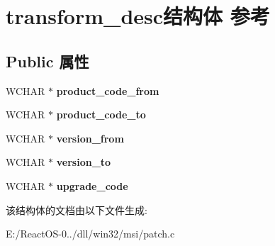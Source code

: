 \hypertarget{structtransform__desc}{}\section{transform\+\_\+desc结构体 参考}
\label{structtransform__desc}
\subsection*{Public 属性}
\begin{DoxyCompactItemize}
\item 
\mbox{\label{structtransform__desc_af6caed1112fc2fe74f4c469a9a1185cf}} 
W\+C\+H\+AR $\ast$ {\bfseries product\+\_\+code\+\_\+from}
\item 
\mbox{\label{structtransform__desc_aad8d3162eb84e46edcf75cfb6d4898cb}} 
W\+C\+H\+AR $\ast$ {\bfseries product\+\_\+code\+\_\+to}
\item 
\mbox{\label{structtransform__desc_a442c39f8eaf7ac7fdccfe45ee8c11213}} 
W\+C\+H\+AR $\ast$ {\bfseries version\+\_\+from}
\item 
\mbox{\label{structtransform__desc_a514029b9d9f5d9c3c19330832e76e45e}} 
W\+C\+H\+AR $\ast$ {\bfseries version\+\_\+to}
\item 
\mbox{\label{structtransform__desc_a461f8973464687c85b663a3bc1f39f8a}} 
W\+C\+H\+AR $\ast$ {\bfseries upgrade\+\_\+code}
\end{DoxyCompactItemize}


该结构体的文档由以下文件生成\+:\begin{DoxyCompactItemize}
\item 
E\+:/\+React\+O\+S-\/0../dll/win32/msi/patch.\+c\end{DoxyCompactItemize}
